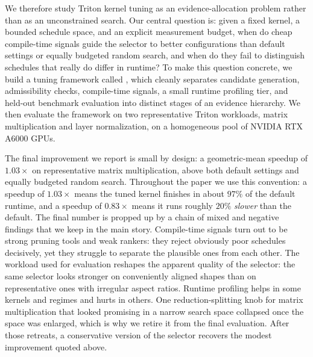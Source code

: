 We therefore study Triton kernel tuning as an evidence-allocation problem rather than as an unconstrained search. Our central question is: given a fixed kernel, a bounded schedule space, and an explicit measurement budget, when do cheap compile-time signals guide the selector to better configurations than default settings or equally budgeted random search, and when do they fail to distinguish schedules that really do differ in runtime? To make this question concrete, we build a tuning framework called \system, which cleanly separates candidate generation, admissibility checks, compile-time signals, a small runtime profiling tier, and held-out benchmark evaluation into distinct stages of an evidence hierarchy. We then evaluate the framework on two representative Triton workloads, matrix multiplication and layer normalization, on a homogeneous pool of NVIDIA RTX A6000 GPUs.

The final improvement we report is small by design: a geometric-mean speedup of $1.03\times$ on representative matrix multiplication, above both default settings and equally budgeted random search. Throughout the paper we use this convention: a speedup of $1.03\times$ means the tuned kernel finishes in about $97\%$ of the default runtime, and a speedup of $0.83\times$ means it runs roughly $20\%$ \emph{slower} than the default. The final number is propped up by a chain of mixed and negative findings that we keep in the main story. Compile-time signals turn out to be strong pruning tools and weak rankers: they reject obviously poor schedules decisively, yet they struggle to separate the plausible ones from each other. The workload used for evaluation reshapes the apparent quality of the selector: the same selector looks stronger on conveniently aligned shapes than on representative ones with irregular aspect ratios. Runtime profiling helps in some kernels and regimes and hurts in others. One reduction-splitting knob for matrix multiplication that looked promising in a narrow search space collapsed once the space was enlarged, which is why we retire it from the final evaluation. After those retreats, a conservative version of the selector recovers the modest improvement quoted above.

